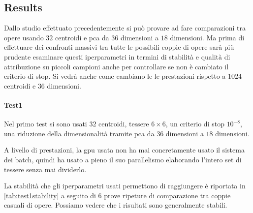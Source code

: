 \begin{toDo}
	\subsection{Results}
	Dallo studio effettuato precedentemente si può provare ad fare comparazioni tra opere usando $32$ centroidi e \gls{pca} da $36$ dimensioni a $18$ dimensioni. Ma prima di effettuare dei confronti massivi tra tutte le possibili coppie di opere sarà più prudente esaminare questi iperparametri in termini di stabilità e qualità di attribuzione su piccoli campioni anche per controllare se non è cambiato il criterio di stop.
	Si vedrà anche come cambiano le le prestazioni rispetto a $1024$ centroidi e $36$ dimensioni.

	\paragraph{Test1}
	Nel primo test si sono usati $32$ centroidi, tessere $6\times6$, un criterio di stop $10^{-8}$, una riduzione della dimensionalità tramite \gls{pca} da $36$ dimensioni a $18$ dimensioni.

	\noindent A livello di prestazioni, la \gls{gpu} usata non ha mai concretamente usato il sistema dei batch, quindi ha usato a pieno il suo parallelismo elaborando l'intero set di tessere senza mai dividerlo.

	\noindent La stabilità che gli iperparametri usati permettono di raggiungere è riportata in \cref{tab:test1stability} a seguito di $6$ prove ripeture di comparazione tra coppie casuali di opere. Possiamo vedere che i risultati sono generalmente stabili.


\end{toDo}
